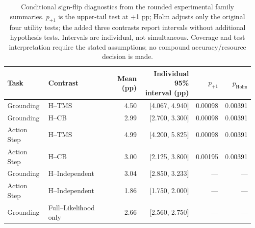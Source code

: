 \begin{table}[!tbp]
\centering
\small
\setlength{\tabcolsep}{4pt}
\renewcommand{\arraystretch}{1.13}
\renewcommand{\thetable}{C.\arabic{table}}
\renewcommand{\theHtable}{C.\arabic{table}}
\setcounter{table}{6}
\begin{adjustbox}{max width=\textwidth}
\begin{tabular}{llrrrr}
\toprule
Task & Contrast & Mean (pp) & \shortstack[r]{Individual 95\%\\interval (pp)} & $p_{+1}$ & $p_{\mathrm{Holm}}$ \\
\midrule
Grounding & H--TMS & 4.50 & [4.067, 4.940] & 0.00098 & 0.00391 \\
Grounding & H--CB & 2.99 & [2.700, 3.300] & 0.00098 & 0.00391 \\
Action Step & H--TMS & 4.99 & [4.200, 5.825] & 0.00098 & 0.00391 \\
Action Step & H--CB & 3.00 & [2.125, 3.800] & 0.00195 & 0.00391 \\
Grounding & H--Independent & 3.04 & [2.850, 3.233] & --- & --- \\
Action Step & H--Independent & 1.86 & [1.750, 2.000] & --- & --- \\
Grounding & Full--Likelihood only & 2.66 & [2.560, 2.750] & --- & --- \\
\bottomrule
\end{tabular}
\end{adjustbox}
\caption{Conditional sign-flip diagnostics from the rounded experimental family summaries. $p_{+1}$ is the upper-tail test at +1 pp; Holm adjusts only the original four utility tests; the added three contrasts report intervals without additional hypothesis tests. Intervals are individual, not simultaneous. Coverage and test interpretation require the stated assumptions; no compound accuracy/resource decision is made.}
\label{tab:C.7}
\end{table}
